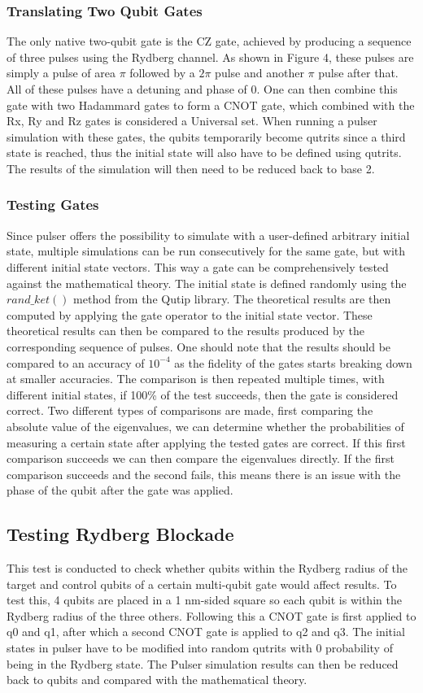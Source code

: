 \subsubsection{Translating Two Qubit Gates}
\label{sec:MultiGatesTranslating}
The only native two-qubit gate is the CZ gate, achieved by producing a sequence of three pulses using the Rydberg channel. As shown in Figure 4,
these pulses are simply a pulse of area $\pi$ followed by a $2\pi$ pulse and another $\pi$ pulse after that. All of these pulses have a detuning and phase of 0.
One can then combine this gate with two Hadammard gates to form a CNOT gate, which combined with the Rx, Ry and Rz gates is considered a Universal set.
When running a pulser simulation with these gates, the qubits temporarily become qutrits since a third state is reached, thus the initial state will also have to be defined using qutrits.
The results of the simulation will then need to be reduced back to base 2.
\subsubsection{Testing Gates}
\label{sec:Gatetest}
Since pulser offers the possibility to simulate with a user-defined arbitrary initial state, multiple simulations can be run consecutively for the same gate, but with different initial state vectors.
This way a gate can be comprehensively tested against the mathematical theory.
The initial state is defined randomly using the $rand\_ket()$ method from the Qutip library. The theoretical results are then computed by applying the gate operator to the initial state vector.
These theoretical results can then be compared to the results produced by the corresponding sequence of pulses.
One should note that the results should be compared to an accuracy of $10^{-4}$ as the fidelity of the gates starts breaking down at smaller accuracies.
The comparison is then repeated multiple times, with different initial states, if 100\% of the test succeeds, then the gate is considered correct.
Two different types of comparisons are made, first comparing the absolute value of the eigenvalues, we can determine whether the probabilities of measuring a certain state after applying the tested gates are correct.
If this first comparison succeeds we can then compare the eigenvalues directly. If the first comparison succeeds and the second fails, this means there is an issue with the phase of the qubit after the gate was applied.


\subsection{Testing Rydberg Blockade}
This test is conducted to check whether qubits within the Rydberg radius of the target and control qubits of a certain multi-qubit gate would affect results.
To test this, 4 qubits are placed in a 1 nm-sided square so each qubit is within the Rydberg radius of the three others.
Following this a CNOT gate is first applied to q0 and q1, after which a second CNOT gate is applied to q2 and q3.
The initial states in pulser have to be modified into random qutrits with 0 probability of being in the Rydberg state.
The Pulser simulation results can then be reduced back to qubits and compared with the mathematical theory.


